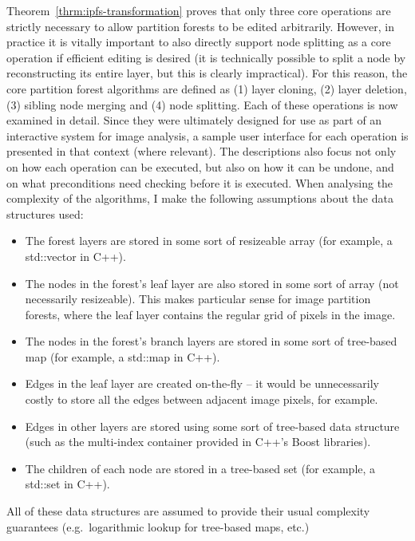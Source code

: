 \noindent Theorem~\ref{thrm:ipfs-transformation} proves that only three core operations are strictly necessary to allow partition forests to be edited arbitrarily. However, in practice it is vitally important to also directly support node splitting as a core operation if efficient editing is desired (it is technically possible to split a node by reconstructing its entire layer, but this is clearly impractical). For this reason, the core partition forest algorithms are defined as (1) layer cloning, (2) layer deletion, (3) sibling node merging and (4) node splitting. Each of these operations is now examined in detail. Since they were ultimately designed for use as part of an interactive system for image analysis, a sample user interface for each operation is presented in that context (where relevant). The descriptions also focus not only on how each operation can be executed, but also on how it can be undone, and on what preconditions need checking before it is executed. When analysing the complexity of the algorithms, I make the following assumptions about the data structures used:

\begin{itemize}
\item The forest layers are stored in some sort of resizeable array (for example, a std::vector in C++).
\item The nodes in the forest's leaf layer are also stored in some sort of array (not necessarily resizeable). This makes particular sense for image partition forests, where the leaf layer contains the regular grid of pixels in the image.
\item The nodes in the forest's branch layers are stored in some sort of tree-based map (for example, a std::map in C++).
\item Edges in the leaf layer are created on-the-fly -- it would be unnecessarily costly to store all the edges between adjacent image pixels, for example.
\item Edges in other layers are stored using some sort of tree-based data structure (such as the multi-index container provided in C++'s Boost libraries).
\item The children of each node are stored in a tree-based set (for example, a std::set in C++).
\end{itemize}

\noindent All of these data structures are assumed to provide their usual complexity guarantees (e.g.~logarithmic lookup for tree-based maps, etc.)

\newpage

